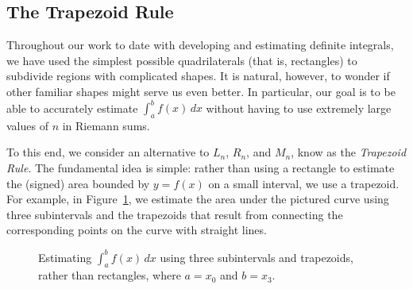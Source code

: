 

\subsection*{The Trapezoid Rule} 

Throughout our work to date with developing and estimating definite integrals, we have used the simplest possible quadrilaterals (that is, rectangles) to subdivide regions with complicated shapes. It is natural, however, to wonder if other familiar shapes might serve us even better.  In particular, our goal is to be able to accurately estimate $\int_a^b f(x) \, dx$ without having to use extremely large values of $n$ in Riemann sums.

To this end, we consider an alternative to $L_n$, $R_n$, and $M_n$, know as the \emph{Trapezoid Rule}.  The fundamental idea is simple:  rather than using a rectangle to estimate the (signed) area bounded by $y = f(x)$ on a small interval, we use a trapezoid.  For example, in Figure~\ref{F:5.6.TRAP}, we estimate the area under the pictured curve using three subintervals and the trapezoids that result from connecting the corresponding points on the curve with straight lines.

\begin{figure}[h]
\begin{center}
\caption{Estimating $\int_a^b f(x) \, dx$ using three subintervals and trapezoids, rather than rectangles, where $a = x_0$ and $b = x_3$.} 
\label{F:5.6.TRAP}
\end{center}
\end{figure}

